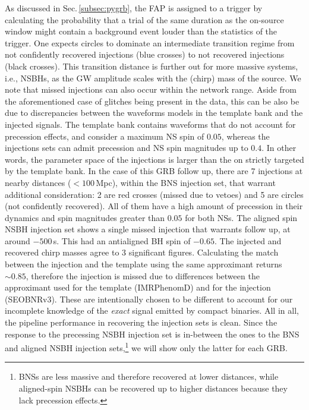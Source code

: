 \documentclass[binding=0.6cm, LaM]{sapthesis}
\begin{document}
	As discussed in Sec.\,\ref{subsec:pygrb}, the FAP is assigned to a trigger 
	by calculating the probability that a trial of the same duration as the on-source window 
	might contain a background event louder than the statistics of the trigger.
        One expects circles to dominate an intermediate transition regime from 
	not confidently recovered injections (blue crosses) to not recovered injections (black crosses).
	This transition distance is further out for more massive systems, i.e., NSBHs, 
	as the GW amplitude scales with the (chirp) mass of the source. 
	We note that missed injections can also occur within the network range.
	Aside from the aforementioned case of glitches being present in the data, 
	this can be also be due to discrepancies between 
	the waveforms models in the template bank and the injected signals. 
	The template bank contains waveforms that do not account for precession effects, 
	and consider a maximum NS spin of $0.05$, whereas the injections sets can admit 
	precession and NS spin magnitudes up to $0.4$.
	In other words, the parameter space of the injections is larger 
	than the on strictly targeted by the template bank.
	In the case of this GRB follow up, there are 7 injections at nearby distances ($<100\,$Mpc), 
	within the BNS injection set, that warrant additional consideration: 
        2 are red crosses (missed due to vetoes) and 5 are circles (not confidently recovered).
	All of them have a high amount of precession in their dynamics and spin magnitudes greater than $0.05$ for both NSs.
	The aligned spin NSBH injection set shows a single missed injection that warrants follow up, 
	at around $-500\,$s.
	This had an antialigned BH spin of $-0.65$. 
	The injected and recovered chirp masses agree to 3 significant figures. 
	Calculating the match between the injection and the template using the same approximant returns $\sim 0.85$, 
	therefore the injection is missed due to differences between the approximant 
	used for the template ({\ttfamily IMRPhenomD}) and for the injection ({\ttfamily SEOBNRv3}).
	These are intentionally chosen to be different to account for our incomplete knowledge 
	of the \emph{exact} signal emitted by compact binaries.
        All in all, the pipeline performance in recovering the injection sets is clean.
	Since the response to the precessing NSBH injection set is in-between the ones to the BNS and aligned NSBH injection sets,\footnote{BNSs are less massive and therefore recovered at lower distances, while aligned-spin NSBHs can be recovered up to higher distances because they lack precession effects.}
	we will show only the latter for each GRB.	
\end{document}

